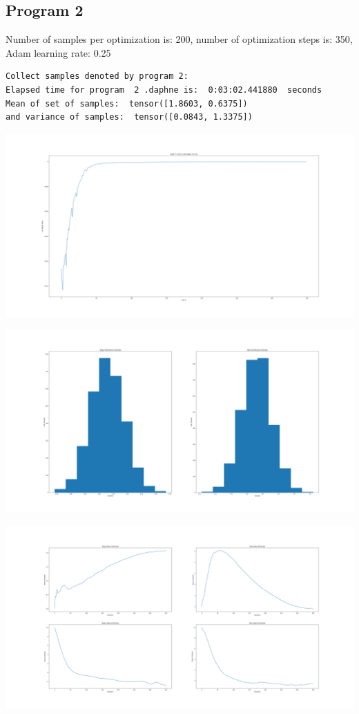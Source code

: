 \documentclass[]{article}
\begin{document}
\subsection{Program 2}
Number of samples per optimization is: 200, number of optimization steps is: 350, Adam learning rate: 0.25
\begin{verbatim}
Collect samples denoted by program 2:
Elapsed time for program  2 .daphne is:  0:03:02.441880  seconds
Mean of set of samples:  tensor([1.8603, 0.6375])
and variance of samples:  tensor([0.0843, 1.3375])
\end{verbatim}
\begin{center}
	\includegraphics[width=\linewidth]{Figures/elbo_2Adam3.png}
\end{center}
\begin{center}
	\includegraphics[width=\linewidth]{Figures/distSlopeBias2.png}
\end{center}
\begin{center}
	\includegraphics[width=\linewidth]{Figures/muSigP2_2.png}
\end{center}
\end{document}
